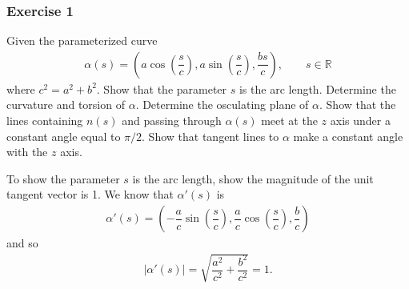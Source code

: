 \documentclass{article}
\newcommand{\R}{\mathbb{R}}
\begin{document}
	\subsubsection*{Exercise 1}
	Given the parameterized curve
	\begin{gather*}
		\alpha(s) = \left( a \cos \left( \dfrac{s}{c} \right), a \sin \left( \dfrac{s}{c} \right), \dfrac{bs}{c} \right), \qquad s \in \R 
	\end{gather*}
	where $c^2 = a^2 + b^2$. Show that the parameter $s$ is the arc length. Determine the curvature and torsion of $\alpha$. Determine the osculating plane of $\alpha$. Show that the lines containing $n(s)$ and passing through $\alpha(s)$ meet at the $z$ axis under a constant angle equal to $\pi/2$. Show that tangent lines to $\alpha$ make a constant angle with the $z$ axis.
	
	To show the parameter $s$ is the arc length, show the magnitude of the unit tangent vector is 1. We know that $\alpha'(s)$ is
	\begin{gather*}
		\alpha'(s) = \left( -\dfrac{a}{c} \sin \left( \dfrac{s}{c} \right), \dfrac{a}{c} \cos \left( \dfrac{s}{c} \right), \dfrac{b}{c} \right)
	\end{gather*}
	and so 
	\begin{gather*}
		|\alpha'(s)| = \sqrt{ \dfrac{a^2}{c^2} + \dfrac{b^2}{c^2} } = 1.
	\end{gather*}
	
\end{document}
